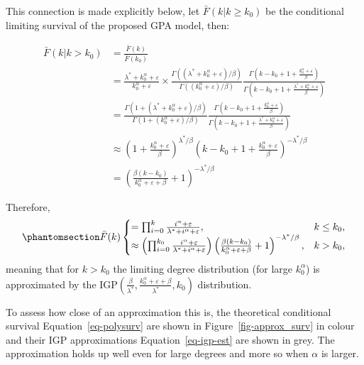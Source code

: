 \documentclass[
  sn-basic,
  10pt,
]{sn-jnl}
\theoremstyle{plain}
\theoremstyle{plain}
\theoremstyle{remark}
\begin{document}
This connection is made explicitly below, let \(\bar F (k|k\ge k_0)\) be
the conditional limiting survival of the proposed GPA model, then:

\begin{align*}
\bar F(k|k>k_0) &= \frac{\bar F(k)}{\bar F(k_0)}\\
&= \frac{\lambda^* + k_0^\alpha + \varepsilon}{k_0^\alpha + \varepsilon}\times \frac{\Gamma((\lambda^*+k_0^\alpha + \varepsilon)/\beta)}{\Gamma\left((k_0^\alpha + \varepsilon)/\beta\right)} \frac{\Gamma\left(k-k_0 + 1 +\frac{k_0^\alpha + \varepsilon}{\beta}\right)}{\Gamma\left(k-k_0 + 1 +\frac{\lambda^* +k_0^\alpha + \varepsilon}{\beta}\right)}\\
&=\frac{\Gamma(1 + (\lambda^*+k_0^\alpha + \varepsilon)/\beta)}{\Gamma\left(1+(k_0^\alpha + \varepsilon)/\beta\right)} \frac{\Gamma\left(k-k_0 + 1 +\frac{k_0^\alpha + \varepsilon}{\beta}\right)}{\Gamma\left(k-k_0 + 1 +\frac{\lambda^* +k_0^\alpha + \varepsilon}{\beta}\right)}\\
&\approx \left(1+\frac{k_0^\alpha + \varepsilon}{\beta}\right)^{\lambda^*/\beta} \left(k-k_0+1+\frac{k_0^\alpha + \varepsilon}{\beta}\right)^{-\lambda^*/\beta}\\
&=\left(\frac{\beta(k-k_0)}{k_0^{\alpha}+\varepsilon+\beta} + 1\right)^{-\lambda^{*}/\beta}
\end{align*}

Therefore, \begin{equation}\phantomsection\label{eq-igp-est}{
\bar F(k) 
\begin{cases}
=\prod_{i=0}^{k}\frac{i^\alpha + \varepsilon}{\lambda^*+i^\alpha + \varepsilon},&k\le k_0,\\
\approx \left(\prod_{i=0}^{k_0}\frac{i^\alpha + \varepsilon}{\lambda^* + i^\alpha + \varepsilon}\right)\left(\frac{\beta(k-k_0)}{k_0^{\alpha}+\varepsilon+\beta} + 1\right)^{-\lambda^{*}/\beta},&k > k_0,
\end{cases}
}\end{equation} meaning that for \(k> k_0\) the limiting degree
distribution (for large \(k_0^\alpha\)) is approximated by the
\(\text{IGP}\left(\frac{\beta}{\lambda^*}, \frac{k_0^\alpha + \varepsilon+\beta}{\lambda^*},k_0\right)\)
distribution.

To assess how close of an approximation this is, the theoretical
conditional survival Equation~\ref{eq-polysurv} are shown in
Figure~\ref{fig-approx_surv} in colour and their IGP approximations
Equation~\ref{eq-igp-est} are shown in grey. The approximation holds up
well even for large degrees and more so when \(\alpha\) is larger.
\end{document}
